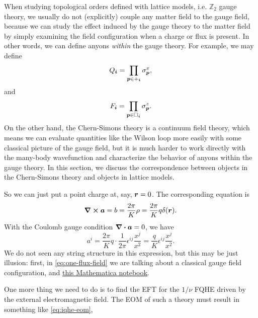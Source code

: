 \documentclass[hyperref, a4paper]{article}
\begin{document}
When studying topological orders defined with lattice models, i.e. $\mathbb{Z}_2$ gauge theory, we usually 
do not (explicitly) couple any matter field to the gauge field, because we can study the effect induced by 
the gauge theory to the matter field by simply examining the field configuration when a charge or flux is 
present. In other words, we can define anyons \emph{within} the gauge theory. For example, we may define 
\begin{equation}
    Q_{\vb*{i}} = \prod_{\vb*{p} \in +_{\vb*{i}}} \sigma^x_{\vb*{p}},
\end{equation}
and 
\begin{equation}
    F_{\vb*{i}} = \prod_{\vb*{p} \in \Box_{\vb*{i}}} \sigma^z_{\vb*{p}}.
\end{equation}
On the other hand, the Chern-Simons theory is a continuum field theory, which means we can evaluate quantities like the 
Wilson loop more easily with some classical picture of the gauge field, but it is much harder to 
work directly with the many-body wavefunction and characterize the behavior of anyons within the 
gauge theory. In this section, we discuss the correspondence between objects in the Chern-Simons theory 
and objects in lattice models.

So we can just put a point charge at, say, $\vb*{r} = 0$. The corresponding equation is 
\[
    \curl{\vb*{a}} = b = \frac{2\pi}{K} \rho = \frac{2\pi}{K} q \delta(\vb*{r}).
\]
With the Coulomb gauge condition $\div{\vb*{a}} = 0$, we have 
\begin{equation}
    a^i = \frac{2\pi}{K} q \cdot \frac{1}{2\pi} \epsilon^{ij} \frac{x^j}{x^2} = \frac{q}{K} \epsilon^{ij} \frac{x^j}{x^2}.
    \label{eq:one-flux-field}
\end{equation}
We do not seen any string structure in this expression, but this may be just illusion: first, 
in \eqref{eq:one-flux-field} we are talking about a classical gauge field configuration, and 
\href{chern-simons-single-flux.nb}{this Mathematica notebook}.

One more thing we need to do is to find the EFT for the $1 / \nu$ FQHE driven by the external electromagnetic field.
The EOM of such a theory must result in something like \eqref{eq:iqhe-eom}, 


 
\end{document}
